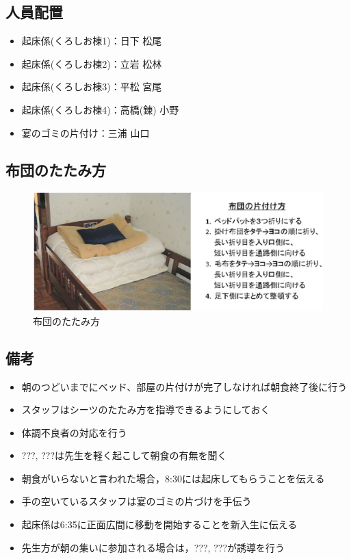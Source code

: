 \subsection{人員配置}
\begin{itemize}
\item 起床係(くろしお棟1)：日下 松尾
\item 起床係(くろしお棟2)：立岩 松林
\item 起床係(くろしお棟3)：平松 宮尾
\item 起床係(くろしお棟4)：高橋(錬) 小野
\item 宴のゴミの片付け：三浦 山口
\end{itemize}


\clearpage


\subsection{布団のたたみ方}
\begin{figure}[h]
\begin{center}
\includegraphics[scale=0.5]{./16/futon_katazuke.eps}
\caption{布団のたたみ方}
\label{fig:futon_katazuke}
\end{center}
\end{figure}


\subsection{備考}
\begin{itemize}
\item 朝のつどいまでにベッド、部屋の片付けが完了しなければ朝食終了後に行う
\item スタッフはシーツのたたみ方を指導できるようにしておく
\item 体調不良者の対応を行う
\item ???, ???は先生を軽く起こして朝食の有無を聞く
\item 朝食がいらないと言われた場合，8:30には起床してもらうことを伝える
\item 手の空いているスタッフは宴のゴミの片づけを手伝う
\item 起床係は6:35に正面広間に移動を開始することを新入生に伝える
\item 先生方が朝の集いに参加される場合は，???, ???が誘導を行う
\end{itemize}

%
